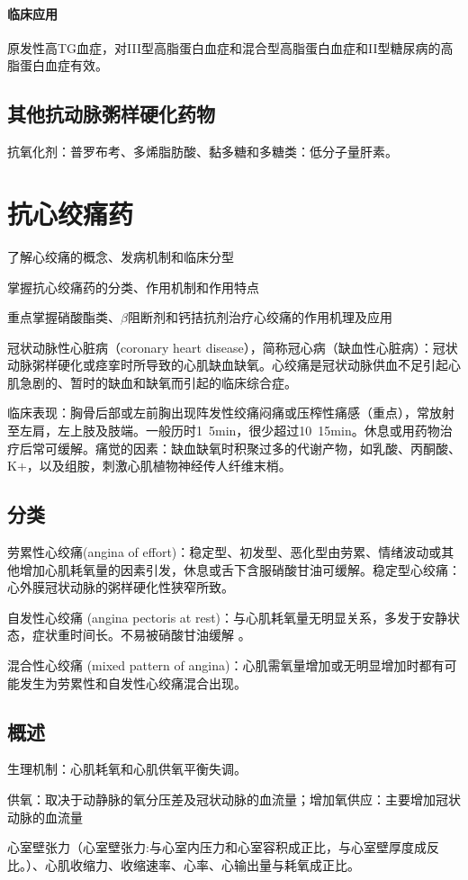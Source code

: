 \documentclass[UTF8]{ctexbook}
\begin{document}
\subsubsection{临床应用}原发性高TG血症，对III型高脂蛋白血症和混合型高脂蛋白血症和II型糖尿病的高脂蛋白血症有效。
\section{其他抗动脉粥样硬化药物}
抗氧化剂：普罗布考、多烯脂肪酸、黏多糖和多糖类：低分子量肝素。
\chapter{抗心绞痛药}
了解心绞痛的概念、发病机制和临床分型

掌握抗心绞痛药的分类、作用机制和作用特点

重点掌握硝酸酯类、\(\beta\)阻断剂和钙拮抗剂治疗心绞痛的作用机理及应用

冠状动脉性心脏病（coronary heart disease），简称冠心病（缺血性心脏病）：冠状动脉粥样硬化或痉挛时所导致的心肌缺血缺氧。心绞痛是冠状动脉供血不足引起心肌急剧的、暂时的缺血和缺氧而引起的临床综合症。

临床表现：胸骨后部或左前胸出现阵发性绞痛闷痛或压榨性痛感（重点），常放射至左肩，左上肢及肢端。一般历时1~5min，很少超过10~15min。休息或用药物治疗后常可缓解。痛觉的因素：缺血缺氧时积聚过多的代谢产物，如乳酸、丙酮酸、K+，以及组胺，刺激心肌植物神经传人纤维末梢。
\section{分类}
劳累性心绞痛(angina of effort)：稳定型、初发型、恶化型由劳累、情绪波动或其他增加心肌耗氧量的因素引发，休息或舌下含服硝酸甘油可缓解。稳定型心绞痛：心外膜冠状动脉的粥样硬化性狭窄所致。

自发性心绞痛 (angina pectoris at rest)：与心肌耗氧量无明显关系，多发于安静状态，症状重时间长。不易被硝酸甘油缓解 。

混合性心绞痛 (mixed pattern of angina)：心肌需氧量增加或无明显增加时都有可能发生为劳累性和自发性心绞痛混合出现。

\section{概述}生理机制：心肌耗氧和心肌供氧平衡失调。

供氧：取决于动静脉的氧分压差及冠状动脉的血流量；增加氧供应：主要增加冠状动脉的血流量

心室壁张力（心室壁张力:与心室内压力和心室容积成正比，与心室壁厚度成反比。）、心肌收缩力、收缩速率、心率、心输出量与耗氧成正比。
\end{document}
